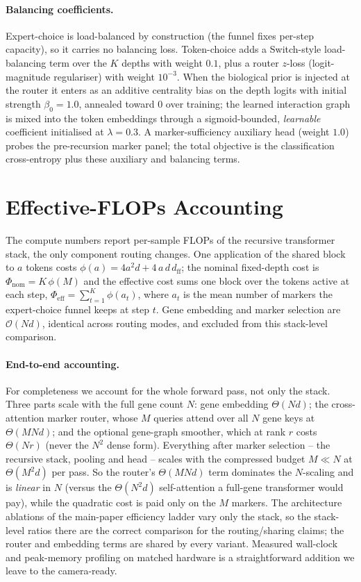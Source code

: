 \documentclass[letterpaper]{article}
\begin{document}
\paragraph{Balancing coefficients.}
Expert-choice is load-balanced by construction (the funnel fixes per-step capacity), so it carries
no balancing loss. Token-choice adds a Switch-style load-balancing term
\cite{shazeer2017outrageously} over the $K$ depths with weight $0.1$, plus a router $z$-loss
(logit-magnitude regulariser) with weight $10^{-3}$. When the biological prior is injected at the
router it enters as an additive centrality bias on the depth logits with initial strength
$\beta_0{=}1.0$, annealed toward $0$ over training; the learned interaction graph is mixed into the
token embeddings through a sigmoid-bounded, \emph{learnable} coefficient initialised at $\lambda{=}0.3$.
A marker-sufficiency auxiliary head (weight $1.0$) probes the pre-recursion marker panel; the total
objective is the classification cross-entropy plus these auxiliary and balancing terms.

\section{Effective-FLOPs Accounting}
\label{app:flops}
The compute numbers report per-sample FLOPs of the recursive transformer stack, the
only component routing changes. One application of the shared block to $a$ tokens costs
$\phi(a)=4a^2 d + 4\,a\,d\,d_{\mathrm{ff}}$; the nominal fixed-depth cost is
$\Phi_{\mathrm{nom}}=K\,\phi(M)$ and the effective cost sums one block over the tokens
active at each step, $\Phi_{\mathrm{eff}}=\sum_{t=1}^{K}\phi(a_t)$, where $a_t$ is the
mean number of markers the expert-choice funnel keeps at step $t$. Gene embedding and
marker selection are $\mathcal{O}(Nd)$, identical across routing modes, and excluded
from this stack-level comparison.

\paragraph{End-to-end accounting.}
For completeness we account for the whole forward pass, not only the stack. Three parts
scale with the full gene count $N$: gene embedding $\Theta(Nd)$; the cross-attention
marker router, whose $M$ queries attend over all $N$ gene keys at
$\Theta(MNd)$; and the optional gene-graph smoother, which at rank $r$ costs
$\Theta(Nr)$ (never the $N^2$ dense form). Everything after marker selection -- the
recursive stack, pooling and head -- scales with the compressed budget $M\ll N$ at
$\Theta(M^2d)$ per pass. So the router's $\Theta(MNd)$ term dominates the $N$-scaling
and is \emph{linear} in $N$ (versus the $\Theta(N^2 d)$ self-attention a full-gene
transformer would pay), while the quadratic cost is paid only on the $M$ markers. The
architecture ablations of the main-paper efficiency ladder vary only the stack, so the stack-level
ratios there are the correct comparison for the routing/sharing claims; the router and
embedding terms are shared by every variant. Measured wall-clock and peak-memory
profiling on matched hardware is a straightforward addition we leave to the camera-ready.
\end{document}
